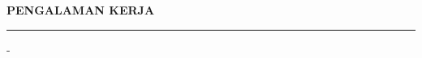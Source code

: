 \documentclass[12pt,a4paper]{article}
\begin{document}

\vspace{0.5cm}
\textbf{PENGALAMAN KERJA}
\vspace{0.2cm}
\hrule
\vspace{0.4cm}

-







\end{document}
